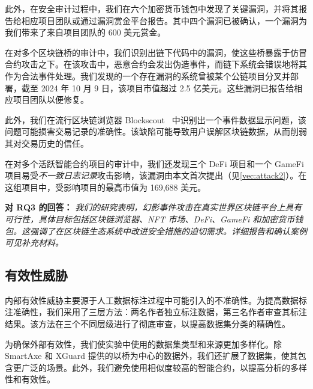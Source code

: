 此外，在安全审计过程中，我们在六个加密货币钱包中发现了关键漏洞，并将其报告给相应项目团队或通过漏洞赏金平台报告。其中四个漏洞已被确认，一个漏洞为我们带来了来自项目团队的 600 美元赏金。

在对多个区块链桥的审计中，我们识别出链下代码中的漏洞，使这些桥暴露于仿冒合约攻击之下。在该攻击中，恶意合约会发出伪造事件，而链下系统会错误地将其作为合法事件处理。我们发现的一个存在漏洞的系统曾被某个公链项目分叉并部署，截至 2024 年 10 月 9 日，该项目市值超过 2.5 亿美元。这些漏洞已报告给相应项目团队以便修复。


此外，我们在流行区块链浏览器 Blockscout~\cite{error_display} 中识别出一个事件数据显示问题，该问题可能损害交易记录的准确性。该缺陷可能导致用户误解区块链数据，从而削弱其对交易历史的信任。

在对多个活跃智能合约项目的审计中，我们还发现三个 DeFi 项目和一个 GameFi 项目易受\emph{不一致日志记录}攻击影响，该漏洞由本文首次提出（见\ref{vec:attack2}）。在这组项目中，受影响项目的最高市值为 169,688 美元。


\vspace{\baselineskip}
\begin{mdframed}
\noindent\textbf{对 RQ3 的回答：} \textit{我们的研究表明，幻影事件攻击在真实世界区块链平台上具有可行性，具体目标包括区块链浏览器、NFT 市场、DeFi、GameFi 和加密货币钱包。这强调了在区块链生态系统中改进安全措施的迫切需求。详细报告和确认案例可见补充材料。}
\end{mdframed}


\subsection{有效性威胁}
内部有效性威胁主要源于人工数据标注过程中可能引入的不准确性。为提高数据标注准确性，我们采用了三层方法：两名作者独立标注数据，第三名作者审查其标注结果。该方法在三个不同层级进行了彻底审查，以提高数据集分类的精确性。

为确保外部有效性，我们使实验中使用的数据集类型和来源更加多样化。除 SmartAxe 和 XGuard 提供的以桥为中心的数据外，我们还扩展了数据集，使其包含更广泛的场景。此外，我们避免使用相似度较高的智能合约，以提高分析的多样性和有效性。
